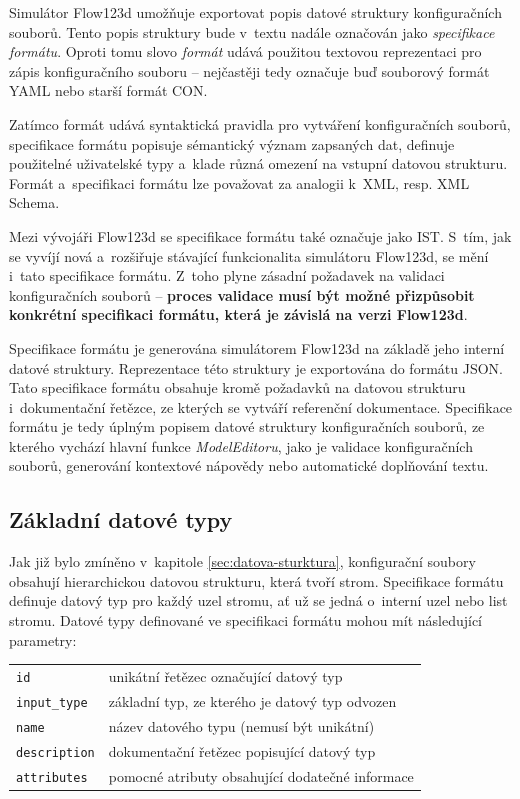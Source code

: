 \documentclass[FM,bw,DP]{tulthesis}
\begin{document}
Simulátor Flow123d umožňuje exportovat popis datové struktury konfiguračních souborů. Tento popis struktury bude v~textu nadále označován jako \textit{specifikace formátu}. Oproti tomu slovo \textit{formát} udává použitou textovou reprezentaci pro zápis konfiguračního souboru -- nejčastěji tedy označuje buď souborový formát \gls{YAML} nebo starší formát \gls{CON}.

Zatímco formát udává syntaktická pravidla pro vytváření konfiguračních souborů, specifikace formátu popisuje sémantický význam zapsaných dat, definuje použitelné uživatelské typy a~klade různá omezení na vstupní datovou strukturu. Formát a~specifikaci formátu lze považovat za analogii k~\gls{XML}, resp. \gls{XML} Schema.

Mezi vývojáři Flow123d se specifikace formátu také označuje jako \gls{IST}. S~tím, jak se vyvíjí nová a~rozšiřuje stávající funkcionalita simulátoru Flow123d, se mění i~tato specifikace formátu. Z~toho plyne zásadní požadavek na validaci konfiguračních souborů -- \textbf{proces validace musí být možné přizpůsobit konkrétní specifikaci formátu, která je závislá na verzi Flow123d}.

Specifikace formátu je generována simulátorem Flow123d na základě jeho interní datové struktury. Reprezentace této struktury je exportována do formátu \gls{JSON}. Tato specifikace formátu obsahuje kromě požadavků na datovou strukturu i~dokumentační řetězce, ze kterých se vytváří referenční dokumentace. Specifikace formátu je tedy úplným popisem datové struktury konfiguračních souborů, ze kterého vychází hlavní funkce \textit{ModelEditoru}, jako je validace konfiguračních souborů, generování kontextové nápovědy nebo automatické doplňování textu.

\subsection{Základní datové typy}
\label{sec:analyza-specifikace-formatu-zakladni-datove-typy}
Jak již bylo zmíněno v~kapitole \ref{sec:datova-sturktura}, konfigurační soubory obsahují hierarchickou datovou strukturu, která tvoří strom. Specifikace formátu definuje datový typ pro každý uzel stromu, ať už se jedná o~interní uzel nebo list stromu. Datové typy definované ve specifikaci formátu mohou mít následující parametry:


\vspace{0.5cm}
\begin{tabular}{m{3cm}@{}l}
\texttt{id}\dotfill & unikátní řetězec označující datový typ \\
\texttt{input\_type}\dotfill & základní typ, ze kterého je datový typ odvozen  \\
\texttt{name}\dotfill & název datového typu (nemusí být unikátní) \\
\texttt{description}\dotfill & dokumentační řetězec popisující datový typ \\
\texttt{attributes}\dotfill & pomocné atributy obsahující dodatečné informace \\
\end{tabular}
\vspace{0.5cm}
\end{document}
